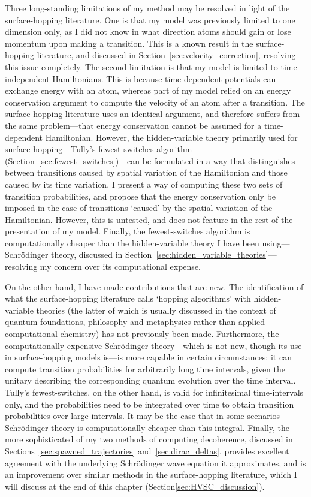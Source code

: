 Three long-standing limitations of my method may be resolved in light of the surface-hopping literature. One is that my model was previously limited to one dimension only, as I did not know in what direction atoms should gain or lose momentum upon making a transition. This is a known result in the surface-hopping literature, and discussed in Section~\ref{sec:velocity_correction}, resolving this issue completely. The second limitation is that my model is limited to time-independent Hamiltonians. This is because time-dependent potentials can exchange energy with an atom, whereas part of my model relied on an energy conservation argument to compute the velocity of an atom after a transition. The surface-hopping literature uses an identical argument, and therefore suffers from the same problem---that energy conservation cannot be assumed for a time-dependent Hamiltonian. However, the hidden-variable theory primarily used for surface-hopping---Tully's fewest-switches algorithm (Section~\ref{sec:fewest_switches})---can be formulated in a way that distinguishes between transitions caused by spatial variation of the Hamiltonian and those caused by its time variation. I present a way of computing these two sets of transition probabilities, and propose that the energy conservation only be imposed in the case of transitions `caused' by the spatial variation of the Hamiltonian. However, this is untested, and does not feature in the rest of the presentation of my model. Finally, the fewest-switches algorithm is computationally cheaper than the hidden-variable theory I have been using---Schr\"odinger theory, discussed in Section~\ref{sec:hidden_variable_theories}---resolving my concern over its computational expense.

On the other hand, I have made contributions that are new. The identification of what the surface-hopping literature calls `hopping algorithms' with hidden-variable theories (the latter of which is usually discussed in the context of quantum foundations, philosophy and metaphysics rather than applied computational chemistry) has not previously been made. Furthermore, the computationally expensive Schr\"odinger theory---which is not new, though its use in surface-hopping models is---is more capable in certain circumstances: it can compute transition probabilities for arbitrarily long time intervals, given the unitary describing the corresponding quantum evolution over the time interval. Tully's fewest-switches, on the other hand, is valid for infinitesimal time-intervals only, and the probabilities need to be integrated over time to obtain transition probabilities over large intervals. It may be the case that in some scenarios Schr\"odinger theory is computationally cheaper than this integral. Finally, the more sophisticated of my two methods of computing decoherence, discussed in Sections~\ref{sec:spawned_trajectories} and~\ref{sec:dirac_deltas}, provides excellent agreement with the underlying Schr\"odinger wave equation it approximates, and is an improvement over similar methods in the surface-hopping literature, which I will discuss at the end of this chapter (Section\ref{sec:HVSC_discussion}).

